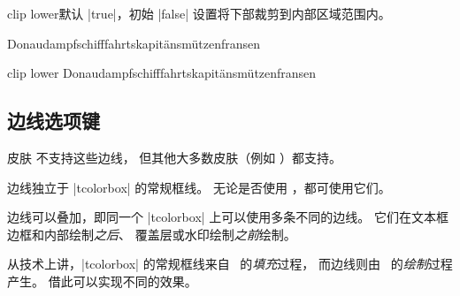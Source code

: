 \begin{docTcbKey}{clip lower}{}{默认 |true|，初始 |false|}
  设置将下部裁剪到内部区域范围内。
\begin{dispExample}

\begin{tcblisting}{}
Donau\-dampf\-schiff\-fahrts\-ka\-pi\-t\"ans\-m\"ut\-zen\-fran\-sen
\end{tcblisting}

\begin{tcblisting}{clip lower}
Donau\-dampf\-schiff\-fahrts\-ka\-pi\-t\"ans\-m\"ut\-zen\-fran\-sen
\end{tcblisting}
\end{dispExample}
\end{docTcbKey}


\clearpage
\subsection{边线选项键}\label{subsec:borderline}
皮肤  不支持这些边线，
但其他大多数皮肤（例如 ）都支持。

边线独立于 |tcolorbox| 的常规框线。
无论是否使用 ，都可使用它们。

边线可以叠加，即同一个 |tcolorbox| 上可以使用多条不同的边线。
它们在文本框边框和内部绘制\emph{之后}、
覆盖层或水印绘制\emph{之前}绘制。

\begin{marker}
从技术上讲，|tcolorbox| 的常规框线来自 \tikzname\ 的\emph{填充}过程，
而边线则由 \tikzname\ 的\emph{绘制}过程产生。
借此可以实现不同的效果。
\end{marker}


